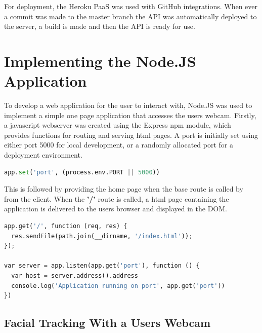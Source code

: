 For deployment, the Heroku PaaS was used with GitHub integrations. When ever a commit was made to the master branch the API was automatically deployed to the server, a build is made and then the API is ready for use.


\section{Implementing the Node.JS Application}
To develop a web application for the user to interact with, Node.JS was used to implement a simple one page application that accesses the users webcam. Firstly, a javascript webserver was created using the Express npm module, which provides functions for routing and serving html pages. A port is initially set using either port 5000 for local development, or a randomly allocated port for a deployment environment. 

\begin{lstlisting}[language=python, frame=single]
	app.set('port', (process.env.PORT || 5000))
\end{lstlisting}

This is followed by providing the home page when the base route is called by from the client. When the \textbf{'/'} route is called, a html page containing the application is delivered to the users browser and displayed in the DOM.

\begin{lstlisting}[language=python, frame=single]
app.get('/', function (req, res) {
  res.sendFile(path.join(__dirname, '/index.html'));
});

var server = app.listen(app.get('port'), function () {
  var host = server.address().address
  console.log('Application running on port', app.get('port'))
})
\end{lstlisting}

\subsection{Facial Tracking With a Users Webcam}

